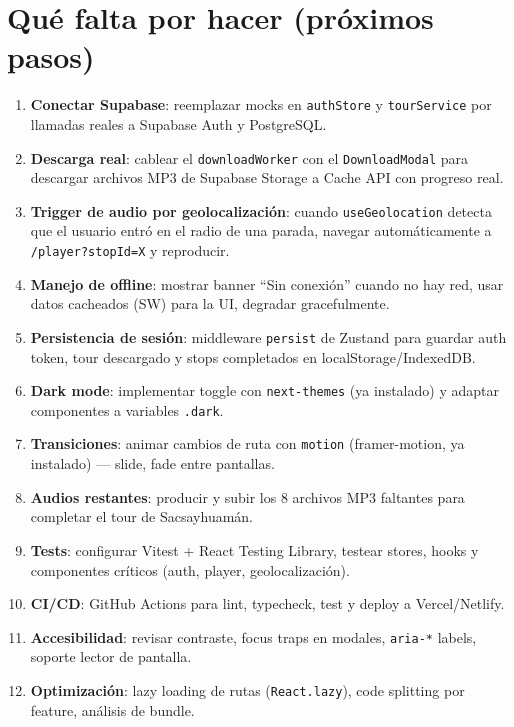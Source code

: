 \documentclass[11pt,a4paper]{article}
\begin{document}
\section{Qué falta por hacer (próximos pasos)}
\begin{enumerate}[nosep]
  \item \textbf{Conectar Supabase}: reemplazar mocks en \texttt{authStore} y \texttt{tourService} por llamadas reales a Supabase Auth y PostgreSQL.
  \item \textbf{Descarga real}: cablear el \texttt{downloadWorker} con el \texttt{DownloadModal} para descargar archivos MP3 de Supabase Storage a Cache API con progreso real.
  \item \textbf{Trigger de audio por geolocalización}: cuando \texttt{useGeolocation} detecta que el usuario entró en el radio de una parada, navegar automáticamente a \texttt{/player?stopId=X} y reproducir.
  \item \textbf{Manejo de offline}: mostrar banner ``Sin conexión'' cuando no hay red, usar datos cacheados (SW) para la UI, degradar gracefulmente.
  \item \textbf{Persistencia de sesión}: middleware \texttt{persist} de Zustand para guardar auth token, tour descargado y stops completados en localStorage/IndexedDB.
  \item \textbf{Dark mode}: implementar toggle con \texttt{next-themes} (ya instalado) y adaptar componentes a variables \texttt{.dark}.
  \item \textbf{Transiciones}: animar cambios de ruta con \texttt{motion} (framer-motion, ya instalado) — slide, fade entre pantallas.
  \item \textbf{Audios restantes}: producir y subir los 8 archivos MP3 faltantes para completar el tour de Sacsayhuamán.
  \item \textbf{Tests}: configurar Vitest + React Testing Library, testear stores, hooks y componentes críticos (auth, player, geolocalización).
  \item \textbf{CI/CD}: GitHub Actions para lint, typecheck, test y deploy a Vercel/Netlify.
  \item \textbf{Accesibilidad}: revisar contraste, focus traps en modales, \texttt{aria-*} labels, soporte lector de pantalla.
  \item \textbf{Optimización}: lazy loading de rutas (\texttt{React.lazy}), code splitting por feature, análisis de bundle.
\end{enumerate}
\end{document}
